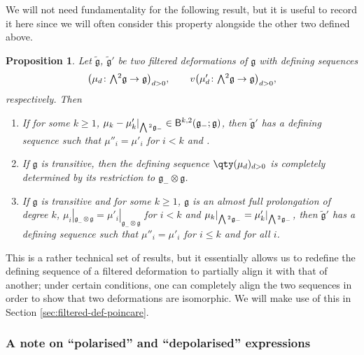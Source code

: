 \documentclass[pdftex]{sigma}
\numberwithin{equation}{section}
\newtheorem{Proposition}[Theorem]{Proposition}
 { \theoremstyle{definition}
\newtheorem{Definition}[Theorem]{Definition}
\newtheorem{Note}[Theorem]{Note}
\newtheorem{Example}[Theorem]{Example}
\newtheorem{Remark}[Theorem]{Remark} }
\newcommand{\fg}{\mathfrak{g}}
\newcommand{\ssB}{\mathsf{B}}
\newcommand{\fgtilde}{\widetilde{\mathfrak{g}}}
\newcommand{\Wedge}{\mathchoice{{\textstyle\bigwedge}}{\bigwedge}{\bigwedge}{\bigwedge}}	%
\newcommand{\1}{\mathbbm{1}}
\begin{document}
We will not need fundamentality for the following result, but it is useful to record it here since we will often consider this property alongside the other two defined above.

\begin{Proposition}\label{prop:def-seq-redef}
	Let $\fgtilde$, $\fgtilde'$ be two filtered deformations of $\fg$ with defining sequences
\[
\bigl(\mu_d\colon\Wedge^2\fg\to\fg\bigr)_{d> 0}, \qquad v\bigl(\mu'_d\colon\Wedge^2\fg\to\fg\bigr)_{d> 0},
\]
 respectively. Then
	\begin{enumerate}\itemsep=0pt
		\item[$(1)$] {\rm\cite[\emph{Proposition}~2.3]{Cheng1998}} If for some $k\geq 1$, $\mu_k-\mu_k'|_{\Wedge^2\fg_-}\in\ssB^{k,2}(\fg_-;\fg)$, then $\fgtilde'$ has a defining sequence  such that $\mu''_i=\mu'_i$ for $i<k$ and \smash{$\mu''_k|_{\Wedge^2\fg_-}=\mu_k|_{\Wedge^2\fg_-}$}.
			\label{item:def-seq-redef-1}
		\item[$(2)$] {\rm\cite[\emph{Proposition}~2.5]{Cheng1998}} If $\fg$ is transitive, then the defining sequence $\qty(\mu_d)_{d> 0}$ is completely determined by its restriction to $\fg_-\otimes\fg$.
			\label{item:def-seq-redef-2}
		\item[$(3)$] {\rm\cite[\emph{Proposition}~2.6]{Cheng1998}} If $\fg$ is transitive and for some $k\geq 1$, $\fg$ is an almost full prolongation of degree $k$, $\mu_i|_{\fg_-\otimes\fg}=\mu'_i|_{\fg_-\otimes\fg}$ for $i<k$ and $\mu_k|_{\Wedge^2\fg_-}=\mu'_k|_{\Wedge^2\fg_-}$, then $\fgtilde'$ has a defining sequence  such that $\mu''_i=\mu'_i$ for $i\leq k$ and \smash{$\mu''_i|_{\Wedge^2\fg_-}=\mu_i'|_{\Wedge^2\fg_-}$} for all $i$.
			\label{item:def-seq-redef-3}
	\end{enumerate}
\end{Proposition}

This is a rather technical set of results, but it essentially allows us to redefine the defining sequence of a filtered deformation to partially align it with that of another; under certain conditions, one can completely align the two sequences in order to show that two deformations are isomorphic. We will make use of this in Section \ref{sec:filtered-def-poincare}.

\subsubsection{A note on ``polarised'' and ``depolarised'' expressions}
\label{sec:polarisation}
\end{document}
